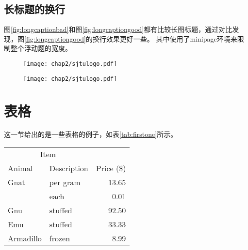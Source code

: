 \subsection{长标题的换行}
\label{sec:longcaption}

图\ref{fig:longcaptionbad}和图\ref{fig:longcaptiongood}都有比较长图标题，通过对比发现，图\ref{fig:longcaptiongood}的换行效果更好一些。
其中使用了minipage环境来限制整个浮动题的宽度。

\begin{figure}[!htp]
 \centering
 \texttt{[image: chap2/sjtulogo.pdf]}
\end{figure}

\begin{figure}[!hbp]
  \centering
  \begin{minipage}[b]{0.6\textwidth}
    \captionstyle{\centering}
    \centering
    \texttt{[image: chap2/sjtulogo.pdf]}
  \end{minipage}     
\end{figure}
  
\clearpage

\section{表格}
\label{sec:tab}

这一节给出的是一些表格的例子，如表\ref{tab:firstone}所示。

\begin{table}[!hpb]
  \centering
  \begin{tabular}{@{}llr@{}} \toprule
    \multicolumn{2}{c}{Item} \\ \cmidrule(r){1-2}
    Animal & Description & Price (\$)\\ \midrule
    Gnat & per gram & 13.65 \\
    & each & 0.01 \\
    Gnu & stuffed & 92.50 \\
    Emu & stuffed & 33.33 \\
    Armadillo & frozen & 8.99 \\ \bottomrule
  \end{tabular}
\end{table}

